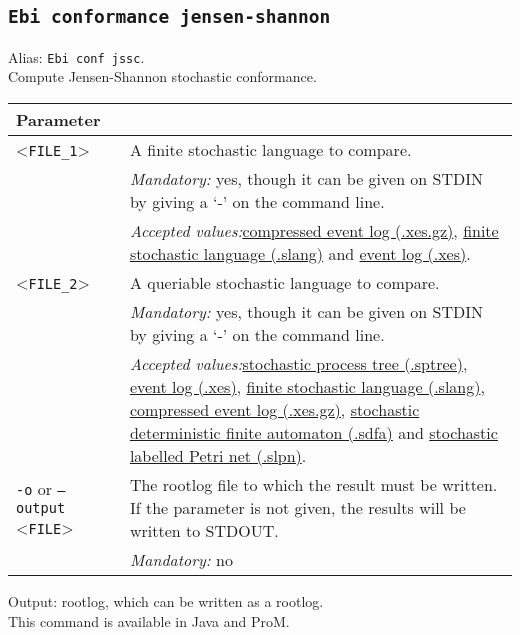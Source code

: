 {\subsection{\texttt{Ebi conformance jensen-shannon}}
\label{command:Ebi conformance jensen-shannon}
Alias: \texttt{Ebi conf jssc}.\\
Compute Jensen-Shannon stochastic conformance.\\
\begin{tabularx}{\linewidth}{lX}
\toprule
Parameter \\\midrule
<\texttt{FILE\_1}>&A finite stochastic language to compare.\\
&\textit{Mandatory:} \quad yes, though it can be given on STDIN by giving a `-' on the command line.\\
&\textit{Accepted values:}\quad \hyperref[filehandler:compressed event log]{compressed event log (.xes.gz)}, \hyperref[filehandler:finite stochastic language]{finite stochastic language (.slang)} and \hyperref[filehandler:event log]{event log (.xes)}.\\
<\texttt{FILE\_2}>&A queriable stochastic language to compare.\\
&\textit{Mandatory:} \quad yes, though it can be given on STDIN by giving a `-' on the command line.\\
&\textit{Accepted values:}\quad \hyperref[filehandler:stochastic process tree]{stochastic process tree (.sptree)}, \hyperref[filehandler:event log]{event log (.xes)}, \hyperref[filehandler:finite stochastic language]{finite stochastic language (.slang)}, \hyperref[filehandler:compressed event log]{compressed event log (.xes.gz)}, \hyperref[filehandler:stochastic deterministic finite automaton]{stochastic deterministic finite automaton (.sdfa)} and \hyperref[filehandler:stochastic labelled Petri net]{stochastic labelled Petri net (.slpn)}.\\
\texttt{-o} or \texttt{--output} <\texttt{FILE}> &
The rootlog file to which the result must be written. If the parameter is not given, the results will be written to STDOUT.\\
&\textit{Mandatory:} \quad no\\
\bottomrule
\end{tabularx}
\noindent Output: rootlog, which can be written as a rootlog.
\\This command is available in Java and ProM.
}
